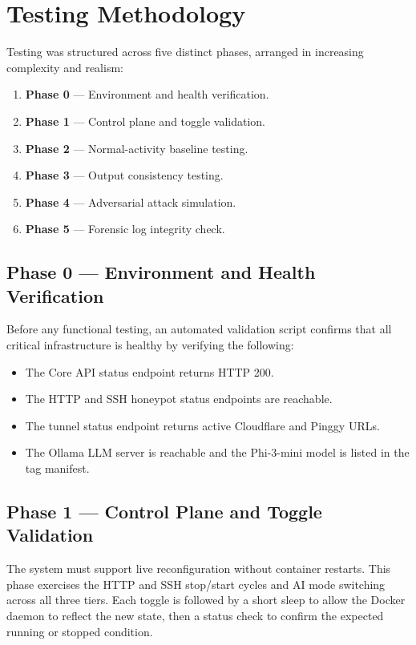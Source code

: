 \section{Testing Methodology}

Testing was structured across five distinct phases, arranged in increasing complexity and realism:

\begin{enumerate}
    \item \textbf{Phase 0} — Environment and health verification.
    \item \textbf{Phase 1} — Control plane and toggle validation.
    \item \textbf{Phase 2} — Normal-activity baseline testing.
    \item \textbf{Phase 3} — Output consistency testing.
    \item \textbf{Phase 4} — Adversarial attack simulation.
    \item \textbf{Phase 5} — Forensic log integrity check.
\end{enumerate}

\subsection{Phase 0 — Environment and Health Verification}

Before any functional testing, an automated validation script confirms that all critical infrastructure is healthy by verifying the following:

\begin{itemize}
    \item The Core API status endpoint returns HTTP 200.
    \item The \ac{HTTP} and \ac{SSH} honeypot status endpoints are reachable.
    \item The tunnel status endpoint returns active Cloudflare and Pinggy URLs.
    \item The Ollama LLM server is reachable and the Phi-3-mini model is listed in the tag manifest.
\end{itemize}

\subsection{Phase 1 — Control Plane and Toggle Validation}

The system must support live reconfiguration without container restarts. This phase exercises the \ac{HTTP} and \ac{SSH} stop/start cycles and AI mode switching across all three tiers. Each toggle is followed by a short sleep to allow the Docker daemon to reflect the new state, then a status check to confirm the expected running or stopped condition.

